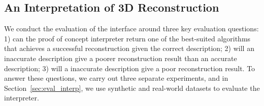 

\subsection{An Interpretation of 3D Reconstruction}
We conduct the evaluation of the interface around three key evaluation questions: 1) can the proof of concept interpreter return one of the best-suited algorithms that achieves a successful reconstruction given the correct description; 2) will an inaccurate description give a poorer reconstruction result than an accurate description; 3) will a inaccurate description give a poor reconstruction result. To answer these questions, we carry out three separate experiments, and in Section~\ref{sec:eval_interp}, we use synthetic and real-world datasets to evaluate the interpreter.


